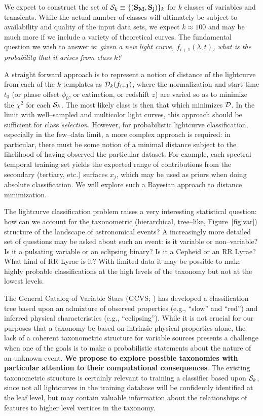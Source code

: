 \smallskip

We expect to construct the set of  ${\cal S}_k \equiv \{({\bf S_M},{\bf
S_j})\}_k$ for $k$ classes of variables and transients. While the actual number
of classes will ultimately be subject to availability and quality of the input
data sets, we expect $k \approx 100$ and may be much more if we include a
variety of theoretical curves. The fundamental question we wish to answer is:
{\it given a new light curve, $f_{i+1}(\lambda, t)$, what is the probability
that it arises from class $k$?}

A straight forward approach is to represent a notion of distance of the
lightcurve from each of the $k$ templates as ${\cal D}_k(f_{i+1})$, where the
normalization and start time $t_0$ (or phase offset $\phi_0$, or extinction, or
redshift $z$) are varied so as to minimize the $\chi^2$ for each ${\cal S}_k$.
The most likely class is then that which minimizes ${\cal D}$. In the limit with
well--sampled and multicolor light curves, this approach should be sufficient
for class {\it selection}. However, for probabilistic lightcurve classification,
especially in the few--data limit, a more complex approach is required: in
particular, there must be some notion of a minimal distance subject to the
likelihood of having observed the particular dataset.  For example, each
spectral--temporal training set yields the expected range of contributions from
the secondary (tertiary, etc.) surfaces $x_j$, which may be used as priors when
doing absolute classification. We will explore such a Bayesian approach to
distance minimization.

The lightcurve classification problem raises a very interesting statistical
question: how can we account for the taxonometric (hierarchical, tree--like,
Figure~\ref{fig:var}) structure of the landscape of astronomical events? A
increasingly more detailed set of questions may be asked about such an event: is
it variable or non--variable? Is it a pulsating variable or an eclipsing binary?
Is it a Cepheid or an RR Lyrae? What kind of RR Lyrae is it?  With limited data
it may be possible to make highly probable classifications at the high levels of
the taxonomy but not at the lowest levels.

The General Catalog of Variable Stars (GCVS; \citealt{ksf+96}) has developed a
classification tree based upon an admixture of observed properties (e.g.,
``slow'' and ``red'') and inferred physical characteristics (e.g.,
``eclipsing'').  While it is not crucial for our purposes that a taxonomy be
based on intrinsic physical properties alone, the lack of a coherent
taxonometric structure for variable sources presents a challenge when one of the
goals is to make a probabilistic statements about the nature of an unknown
event. {\bf We propose to explore possible taxonomies with particular attention
to their computational consequences}.  The existing taxonometric structure is
certainly relevant to training a classifier based upon ${\cal S}_k$, since not
all lightcurves in the training database will be confidently identified at the
leaf level, but may contain valuable information about the relationships of
features to higher level vertices in the taxonomy.

